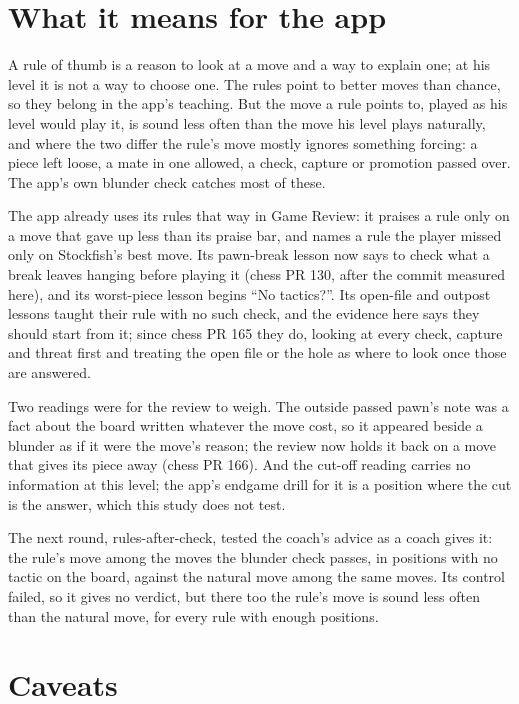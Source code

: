\documentclass[11pt]{article}
\begin{document}
\section{What it means for the app}

A rule of thumb is a reason to look at a move and a way to explain one; at his level it is not a way
to choose one. The rules point to better moves than chance, so they belong in the app's teaching.
But the move a rule points to, played as his level would play it, is sound less often than the move
his level plays naturally, and where the two differ the rule's move mostly ignores something
forcing: a piece left loose, a mate in one allowed, a check, capture or promotion passed over. The
app's own blunder check catches most of these.

The app already uses its rules that way in Game Review: it praises a rule only on a move that gave
up less than its praise bar, and names a rule the player missed only on Stockfish's best move. Its
pawn-break lesson now says to check what a break leaves hanging before playing it (chess PR 130,
after the commit measured here), and its worst-piece lesson begins ``No tactics?''. Its open-file
and outpost lessons taught their rule with no such check, and the evidence here says they should
start from it; since chess PR 165 they do, looking at every check, capture and threat first and
treating the open file or the hole as where to look once those are answered.

Two readings were for the review to weigh. The outside passed pawn's note was a fact about the board
written whatever the move cost, so it appeared beside a blunder as if it were the move's reason; the
review now holds it back on a move that gives its piece away (chess PR 166). And the cut-off reading
carries no information at this level; the app's endgame drill for it is a
position where the cut is the answer, which this study does not test.

The next round, rules-after-check, tested the coach's advice as a coach gives it: the rule's move
among the moves the blunder check passes, in positions with no tactic on the board, against the
natural move among the same moves. Its control failed, so it gives no verdict, but there too the
rule's move is sound less often than the natural move, for every rule with enough positions.

\section{Caveats}
\end{document}
